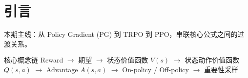 \section{引言}
本期主线：从 Policy Gradient (PG) 到 TRPO 到 PPO，串联核心公式之间的过渡关系。

\begin{importantbox}{核心概念链}
Reward $\to$ 期望 $\to$ 状态价值函数 $V(s)$ $\to$ 状态动作价值函数 $Q(s,a)$ $\to$ Advantage $A(s,a)$ $\to$ On-policy / Off-policy $\to$ 重要性采样
\end{importantbox}


